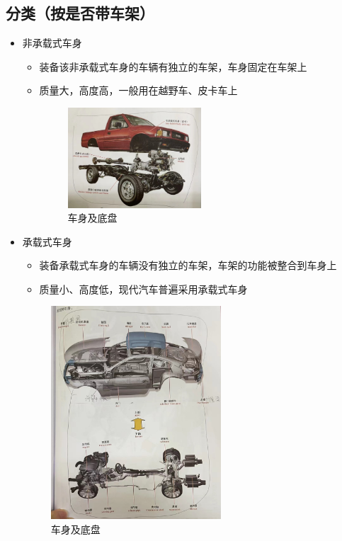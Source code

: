 \subsection{分类（按是否带车架）}
	\begin{itemize}
		\item 非承载式车身
			\begin{itemize}
				\item 装备该非承载式车身的车辆有独立的车架，车身固定在车架上
				
				\item 质量大，高度高，一般用在越野车、皮卡车上
				
					\begin{figure}[htbp]
						\centering
						\caption*{车身及底盘}
						\includegraphics[width=0.5\textwidth]{4-1}
					\end{figure}
			\end{itemize}
		\clearpage
		\item 承载式车身
			\begin{itemize}
				\item  装备承载式车身的车辆没有独立的车架，车架的功能被整合到车身上
				
				\item  质量小、高度低，现代汽车普遍采用承载式车身
			\end{itemize}
			\begin{figure}[htbp]
				\centering
				\caption*{车身及底盘}
				\includegraphics[width=0.6\textwidth]{4-2}
			\end{figure}
	\end{itemize}
